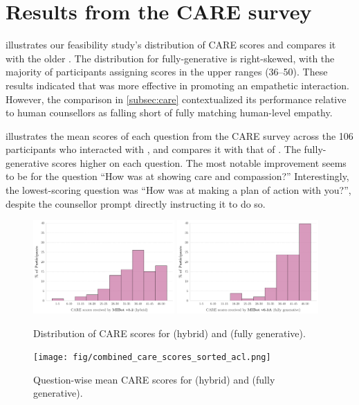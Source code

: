 \section{Results from the CARE survey}
\label{appendix:CAREdist}

 illustrates our feasibility study's distribution of CARE scores and compares it with the older \oldsysname \citep{brown2023mi}. The distribution for fully-generative \sysnamewithv is right-skewed, with the majority of participants assigning scores in the upper ranges (36–50). These results indicated that \sysname was more effective in promoting an empathetic interaction. However, the comparison in \cref{subsec:care} contextualized its performance relative to human counsellors as falling short of fully matching human-level empathy.

 illustrates the mean scores of each question from the CARE survey across the 106 participants who interacted with \sysnamewithv, and compares it with that of \oldsysname. The fully-generative \sysnamewithv scores higher on each question. The most notable improvement seems to be for the question ``How was \sysname at showing care and compassion?''
Interestingly, the lowest-scoring question was ``How was \sysname at making a plan of action with you?'', despite the counsellor prompt directly instructing it to do so.


\begin{figure}[H]
	\centering
	\includegraphics[width=0.48\textwidth]{fig/MIV5.2_care_scores_histogram.png} \hfill
	\includegraphics[width=0.48\textwidth]{fig/2024-11-14-MIV6.3A-2024-11-22-MIV6.3A_care_scores_histogram.png}
	\caption[Distribution of CARE scores for \oldsysname and \sysnamewithv]{Distribution of CARE scores for \oldsysname (hybrid) and \sysnamewithv (fully generative).}
	\label{fig:caredist}
\end{figure}



\vspace{-0.5cm}

\begin{figure}[!htbp]
	\centering
	\texttt{[image: fig/combined\_care\_scores\_sorted\_acl.png]}
	\caption[Question-wise mean CARE scores for \oldsysname and \sysnamewithv]{Question-wise mean CARE scores for \oldsysname (hybrid) and \sysnamewithv (fully generative).}
	\label{fig:caremean}
\end{figure}
